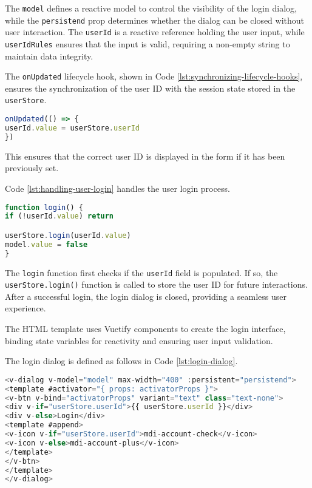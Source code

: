 The \texttt{model} defines a reactive model to control the visibility of the login dialog, while the \texttt{persistend}
prop determines whether the dialog can be closed without user interaction. The \texttt{userId}
is a reactive reference holding the user input, while \texttt{userIdRules}
ensures that the input is valid, requiring a non-empty string to maintain data integrity.

The \texttt{onUpdated} lifecycle hook, shown in Code \ref{lst:synchronizing-lifecycle-hooks}, ensures the synchronization
of the user \acs{ID} with the session state stored in the \texttt{userStore}.

\begin{lstlisting}[language=JavaScript, caption={Synchronizing State with Lifecycle Hooks (\texttt{UserLoginDialog.vue})},
firstnumber=15,label={lst:synchronizing-lifecycle-hooks}]
onUpdated(() => {
userId.value = userStore.userId
})
\end{lstlisting}

This ensures that the correct user \acs{ID} is displayed in the form if it has been previously set.

Code \ref{lst:handling-user-login} handles the user login process.

\begin{lstlisting}[language=JavaScript, caption={Handling User Login (\texttt{UserLoginDialog.vue})},
firstnumber=19,label={lst:handling-user-login}]
function login() {
if (!userId.value) return

userStore.login(userId.value)
model.value = false
}
\end{lstlisting}

The \texttt{login} function first checks if the \texttt{userId} field is populated. If so, the
\texttt{userStore.login()} function is called to store the user \acs{ID} for future interactions. After a successful login,
the login dialog is closed, providing a seamless user experience.

The \ac{HTML} template uses Vuetify components to create the login interface, binding state variables for reactivity and
ensuring user input validation.

The login dialog is defined as follows in Code \ref{lst:login-dialog}.

\begin{lstlisting}[language=JavaScript, caption={Login Dialog (\texttt{UserLoginDialog.vue})},
firstnumber=28,label={lst:login-dialog}]
<v-dialog v-model="model" max-width="400" :persistent="persistend">
<template #activator="{ props: activatorProps }">
<v-btn v-bind="activatorProps" variant="text" class="text-none">
<div v-if="userStore.userId">{{ userStore.userId }}</div>
<div v-else>Login</div>
<template #append>
<v-icon v-if="userStore.userId">mdi-account-check</v-icon>
<v-icon v-else>mdi-account-plus</v-icon>
</template>
</v-btn>
</template>
</v-dialog>
\end{lstlisting}

